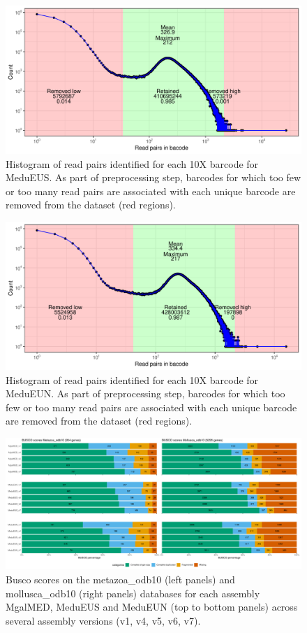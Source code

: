 \documentclass[11pt, a4paper]{article}
\begin{document}
\begin{figure}[h]
	\includegraphics[width=\linewidth]{figures/MeduEUS_preproc_barcode_filt.pdf}
	\caption{Histogram of read pairs identified for each 10X barcode for MeduEUS.
		As part of preprocessing step, barcodes for which too few or too many read pairs are associated with each unique barcode are removed from the dataset (red regions).}
	\label{supfig:preproc_MeduEUS}
\end{figure}

\begin{figure}[h]
	\includegraphics[width=\linewidth]{figures/MeduEUN_preproc_barcode_filt.pdf}
	\caption{Histogram of read pairs identified for each 10X barcode for MeduEUN.
	As part of preprocessing step, barcodes for which too few or too many read pairs are associated with each unique barcode are removed from the dataset (red regions).}
	\label{supfig:preproc_MeduEUN}
\end{figure}

\begin{figure}[h]
	\includegraphics[width=\linewidth]{figures/supfig_busco.pdf}
	\caption{Busco scores on the metazoa\_odb10 (left panels) and mollusca\_odb10 (right panels) databases for each assembly MgalMED, MeduEUS and MeduEUN (top to bottom panels) across several assembly versions (v1, v4, v5, v6, v7).}
	\label{supfig:busco}
\end{figure}
\end{document}
